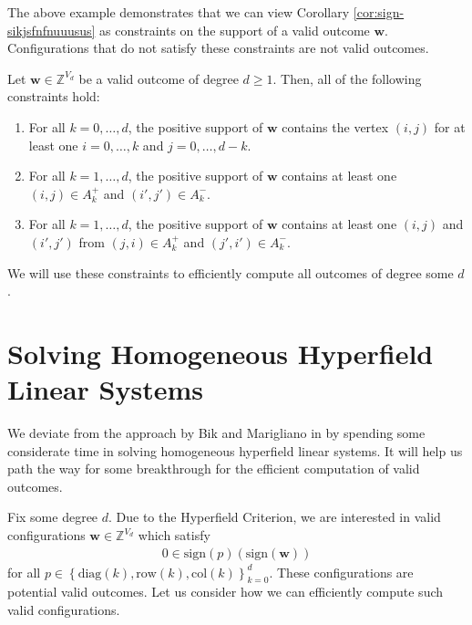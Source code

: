 The above example demonstrates that we can view Corollary \ref{cor:sign-sikjsfnfnuuusus} as constraints on the support of a valid outcome \( \mathbf{w} \). Configurations that do not satisfy these constraints are not valid outcomes.

\begin{corollary}\label{cor:sdnfksjnjkwnrw3r}
    Let \( \mathbf{w} \in \mathbb{Z}^{V_d} \) be a valid outcome of degree \( d \geq 1 \). Then, all of the following constraints hold:
    \begin{enumerate}
        \item For all \( k = 0, \dots, d \), the positive support of \( \mathbf{w} \) contains the vertex \( (i,j) \) for at least one \( i = 0, \dots, k \) and \( j = 0, \dots, d - k \).
        \item For all \( k = 1, \dots, d \), the positive support of \( \mathbf{w} \) contains at least one \( (i,j) \in A_k^+ \) and \( (i',j') \in A_k^- \).
        \item For all \( k = 1, \dots, d \), the positive support of \( \mathbf{w} \) contains at least one \( (i,j) \) and \( (i',j') \) from \( (j,i) \in A_k^+ \) and \( (j',i') \in A_k^- \).
    \end{enumerate}
\end{corollary}

We will use these constraints to efficiently compute all outcomes of degree some \( d \).

\section{Solving Homogeneous Hyperfield Linear Systems}

We deviate from the approach by Bik and Marigliano in \cite{bik2022classifying} by spending some considerate time in solving homogeneous hyperfield linear systems. It will help us path the way for some breakthrough for the efficient computation of valid outcomes.

Fix some degree \( d \). Due to the Hyperfield Criterion, we are interested in valid configurations \( \mathbf{w} \in \mathbb{Z}^{V_d} \) which satisfy 
\begin{align*}
    0 \in \mathrm{sign}(p)(\mathrm{sign}(\mathbf{w}))
\end{align*}
for all \( p \in \left\{ \mathrm{diag}(k), \mathrm{row}(k), \mathrm{col}(k) \right\}_{k=0}^d \). These configurations are potential valid outcomes. Let us consider how we can efficiently compute such valid configurations.

